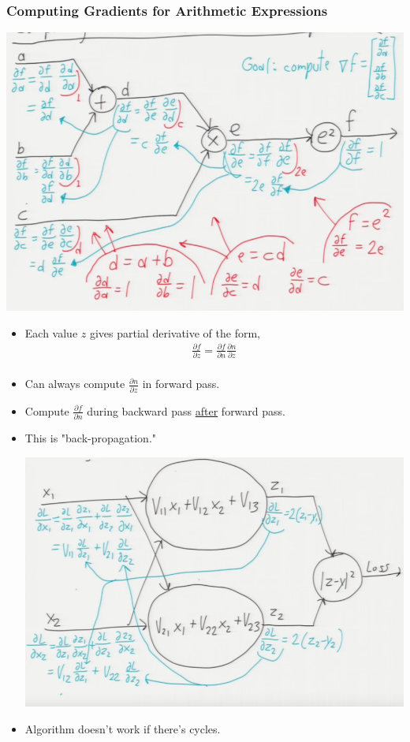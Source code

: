 \documentclass[10pt]{article}
\begin{document}
\subsubsection*{Computing Gradients for Arithmetic Expressions}
	\begin{center}
		\includegraphics[scale=0.3]{../images/backprop}
	\end{center}
\begin{itemize}
	\item Each value $z$ gives partial derivative of the form,
		\begin{align*}
			\frac{\partial f}{\partial z} = \frac{\partial f}{\partial n} \frac{\partial n}{\partial z}\\ 
		\end{align*}
	\item Can always compute $\frac{\partial n}{\partial z}$ in forward pass.
	\item Compute $\frac{\partial f}{\partial n}$ during backward pass \underline{after} forward pass.
	\item This is "back-propagation."
	\begin{center}
		\includegraphics[scale=0.4]{../images/net}
	\end{center}
	\item Algorithm doesn't work if there's cycles.
\end{itemize}
\end{document}
